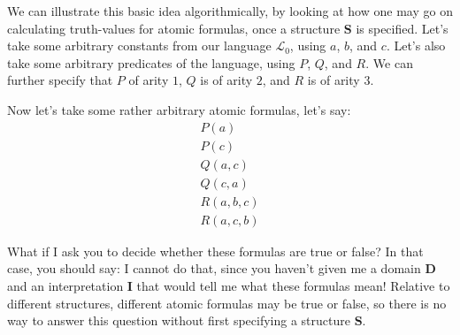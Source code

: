 We can illustrate this basic idea algorithmically, by looking at how one may go on calculating truth-values for atomic formulas, once a structure $\mathbf{S}$ is specified. Let's take some arbitrary constants from our language $\mathcal{L}_0$, using $a$, $b$, and $c$. Let's also take some arbitrary predicates of the language, using $P$, $Q$, and $R$. We can further specify that $P$ of arity $1$, $Q$ is of arity $2$, and $R$ is of arity $3$. 

Now let's take some rather arbitrary atomic formulas, let's say:
\begin{gather}
	P(a)\\
	P(c)\\
	Q(a, c)\\
	Q(c, a)\\
	R(a, b, c)\\
	R(a, c, b)
\end{gather}

What if I ask you to decide whether these formulas are true or false? In that case, you should say: I cannot do that, since you haven't given me a domain $\mathbf{D}$ and an interpretation $\mathbf{I}$ that would tell me what these formulas mean! Relative to different structures, different atomic formulas may be true or false, so there is no way to answer this question without first specifying a structure $\mathbf{S}$. 